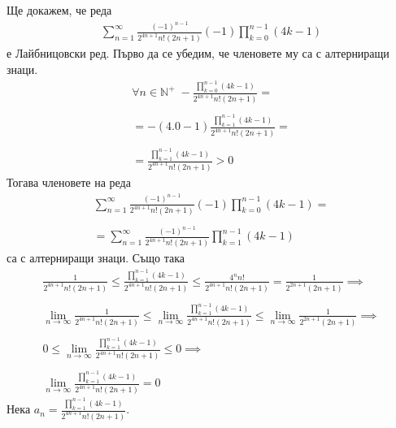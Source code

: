 \documentclass[a4paper,14pt]{extarticle}
\newcommand{\N}{\mathbb{N}}
\begin{document}
Ще докажем, че реда \begin{align*}
    \displaystyle\sum_{n = 1}^{\infty} \frac{(-1)^{n - 1}}{2^{4n + 1} n! (2n + 1)}(-1)\displaystyle\prod_{k = 0}^{n - 1}(4k - 1)
\end{align*} е Лайбницовски ред.
Първо да се убедим, че членовете му са с алтерниращи знаци.
\begin{align*}
    \forall n \in \N^+ \; -\displaystyle\frac{\displaystyle\prod_{k = 0}^{n - 1}(4k - 1)}{2^{4n + 1} n! (2n + 1)} = \\\\
    =  -(4.0 - 1)\displaystyle\frac{\displaystyle\prod_{k = 1}^{n - 1}(4k - 1)}{2^{4n + 1} n! (2n + 1)} = \\\\
    = \displaystyle\frac{\displaystyle\prod_{k = 1}^{n - 1}(4k - 1)}{2^{4n + 1} n! (2n + 1)} > 0 
\end{align*}
Тогава членовете на реда \begin{align*}
    \displaystyle\sum_{n = 1}^{\infty} \frac{(-1)^{n - 1}}{2^{4n + 1} n! (2n + 1)}(-1)\displaystyle\prod_{k = 0}^{n - 1}(4k - 1) = \\\\
    = \displaystyle\sum_{n = 1}^{\infty} \frac{(-1)^{n - 1}}{2^{4n + 1} n! (2n + 1)}\displaystyle\prod_{k = 1}^{n - 1}(4k - 1)
\end{align*}
са с алтерниращи знаци. Също така
\begin{align*}
    \frac{1}{2^{4n + 1}n!(2n + 1)} \leq \displaystyle\frac{\displaystyle\prod_{k = 1}^{n - 1}(4k - 1)}{2^{4n + 1}n!(2n + 1)} \leq \frac{4^nn!}{2^{4n + 1}n!(2n + 1)} = \frac{1}{2^{2n + 1}(2n + 1)} \implies \\\\
    \displaystyle\lim_{n \to \infty} \frac{1}{2^{4n + 1}n!(2n + 1)} \leq \displaystyle\lim_{n \to \infty} \displaystyle\frac{\displaystyle\prod_{k = 1}^{n - 1}(4k - 1)}{2^{4n + 1}n!(2n + 1)} \leq \displaystyle\lim_{n \to \infty} \frac{1}{2^{2n + 1}(2n + 1)} \implies \\\\
    0 \leq \displaystyle\lim_{n \to \infty} \displaystyle\frac{\displaystyle\prod_{k = 1}^{n - 1}(4k - 1)}{2^{4n + 1}n!(2n + 1)} \leq 0 \implies \\\\
    \displaystyle\lim_{n \to \infty} \displaystyle\frac{\displaystyle\prod_{k = 1}^{n - 1}(4k - 1)}{2^{4n + 1}n!(2n + 1)} = 0
\end{align*}
Нека $a_n = \displaystyle\frac{\displaystyle\prod_{k = 1}^{n - 1}(4k - 1)}{2^{4n + 1}n!(2n + 1)}$.
\end{document}
